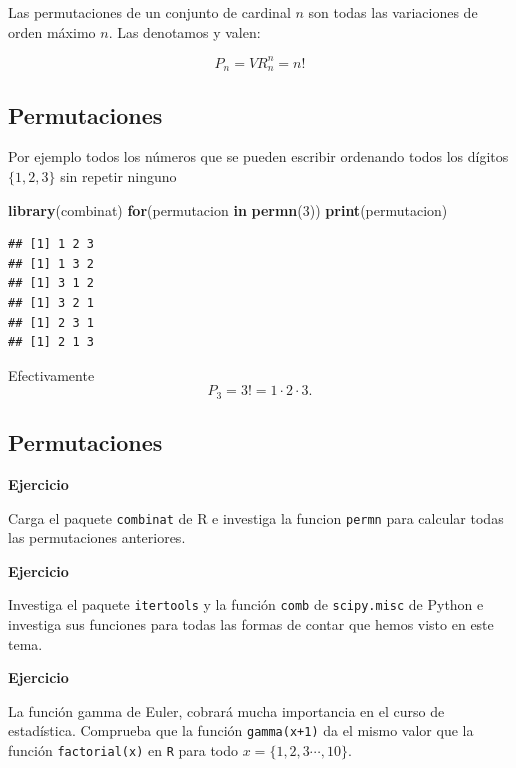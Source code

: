 \documentclass[]{book}
\newenvironment{Shaded}{\begin{snugshade}}{\end{snugshade}}
\newcommand{\ControlFlowTok}[1]{\textcolor[rgb]{0.13,0.29,0.53}{\textbf{#1}}}
\newcommand{\DecValTok}[1]{\textcolor[rgb]{0.00,0.00,0.81}{#1}}
\newcommand{\KeywordTok}[1]{\textcolor[rgb]{0.13,0.29,0.53}{\textbf{#1}}}
\newcommand{\NormalTok}[1]{#1}
\begin{document}
Las permutaciones de un conjunto de cardinal \(n\) son todas las variaciones de orden máximo \(n\).
Las denotamos y valen:

\[
P_n=VR_n^n=n!
\]

\hypertarget{permutaciones-1}{%
\subsection{Permutaciones}\label{permutaciones-1}}

Por ejemplo todos los números que se pueden escribir ordenando todos los dígitos \(\{1,2,3\}\) sin repetir ninguno

\begin{Shaded}
\begin{Highlighting}[]
\KeywordTok{library}\NormalTok{(combinat)}
\ControlFlowTok{for}\NormalTok{(permutacion }\ControlFlowTok{in} \KeywordTok{permn}\NormalTok{(}\DecValTok{3}\NormalTok{)) }\KeywordTok{print}\NormalTok{(permutacion)}
\end{Highlighting}
\end{Shaded}

\begin{verbatim}
## [1] 1 2 3
## [1] 1 3 2
## [1] 3 1 2
## [1] 3 2 1
## [1] 2 3 1
## [1] 2 1 3
\end{verbatim}

Efectivamente
\[
P_3=3!=1\cdot  2\cdot 3.
\]

\hypertarget{permutaciones-2}{%
\subsection{Permutaciones}\label{permutaciones-2}}

\textbf{Ejercicio}

Carga el paquete \texttt{combinat} de R e investiga la funcion \texttt{permn} para calcular todas las permutaciones anteriores.

\textbf{Ejercicio}

Investiga el paquete \texttt{itertools} y la función \texttt{comb} de \texttt{scipy.misc} de Python e investiga sus funciones para todas las formas de contar que hemos visto en este tema.

\textbf{Ejercicio}

La función gamma de Euler, cobrará mucha importancia en el curso de estadística. Comprueba que la función \texttt{gamma(x+1)} da el mismo valor que la función \texttt{factorial(x)} en \texttt{R} para todo \(x = \{1,2,3\cdots,10\}\).
\end{document}
